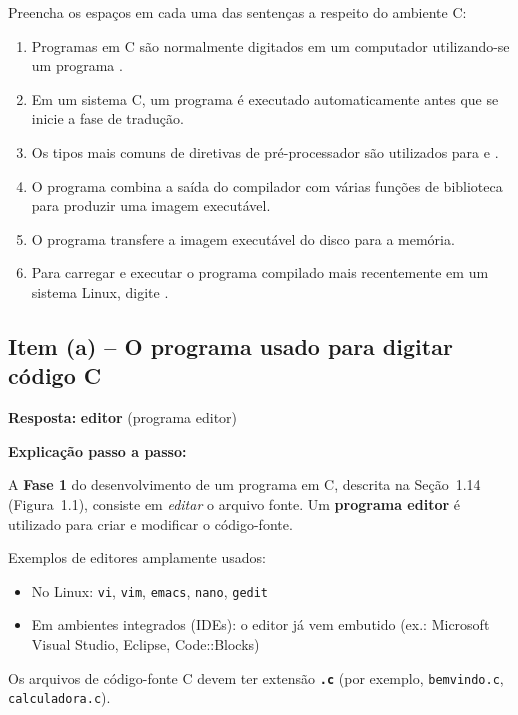 \documentclass[12pt,a4paper]{article}
\begin{document}
\begin{enunciadoBox}[Enunciado]
Preencha os espaços em cada uma das sentenças a respeito do ambiente C:
\begin{enumerate}[label=\textbf{\alph*)}]
  \item Programas em C são normalmente digitados em um computador utilizando-se um programa \underline{\hspace{3cm}}.
  \item Em um sistema C, um programa \underline{\hspace{3cm}} é executado automaticamente antes que se inicie a fase de tradução.
  \item Os tipos mais comuns de diretivas de pré-processador são utilizados para \underline{\hspace{3cm}} e \underline{\hspace{3cm}}.
  \item O programa \underline{\hspace{3cm}} combina a saída do compilador com várias funções de biblioteca para produzir uma imagem executável.
  \item O programa \underline{\hspace{3cm}} transfere a imagem executável do disco para a memória.
  \item Para carregar e executar o programa compilado mais recentemente em um sistema Linux, digite \underline{\hspace{3cm}}.
\end{enumerate}
\end{enunciadoBox}

\bigskip

\subsection*{Item (a) -- O programa usado para digitar código C}

\begin{respostabox}
\textbf{Resposta:} \textcolor{deitelblue}{\textbf{editor} (programa editor)}

\medskip
\textbf{Explicação passo a passo:}

A \textbf{Fase 1} do desenvolvimento de um programa em C, descrita na Seção~1.14
(Figura~1.1), consiste em \textit{editar} o arquivo fonte. Um \textbf{programa editor}
é utilizado para criar e modificar o código-fonte.

Exemplos de editores amplamente usados:
\begin{itemize}
  \item No Linux: \texttt{vi}, \texttt{vim}, \texttt{emacs}, \texttt{nano}, \texttt{gedit}
  \item Em ambientes integrados (IDEs): o editor já vem embutido (ex.: Microsoft Visual
  Studio, Eclipse, Code::Blocks)
\end{itemize}

Os arquivos de código-fonte C devem ter extensão \textbf{\texttt{.c}} (por exemplo,
\texttt{bemvindo.c}, \texttt{calculadora.c}).
\end{respostabox}
\end{document}
